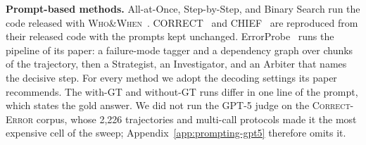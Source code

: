 \textbf{Prompt-based methods.}
All-at-Once, Step-by-Step, and Binary Search run the code released with \textsc{Who\&When}~\citep{whoandwhen}. CORRECT~\citep{correct} and CHIEF~\citep{chief} are reproduced from their released code with the prompts kept unchanged. ErrorProbe~\citep{errorprobe} runs the pipeline of its paper: a failure-mode tagger and a dependency graph over chunks of the trajectory, then a Strategist, an Investigator, and an Arbiter that names the decisive step. For every method we adopt the decoding settings its paper recommends. The with-GT and without-GT runs differ in one line of the prompt, which states the gold answer. We did not run the GPT-5 judge on the \textsc{Correct-Error} corpus, whose 2{,}226 trajectories and multi-call protocols made it the most expensive cell of the sweep; Appendix~\ref{app:prompting-gpt5} therefore omits it.



